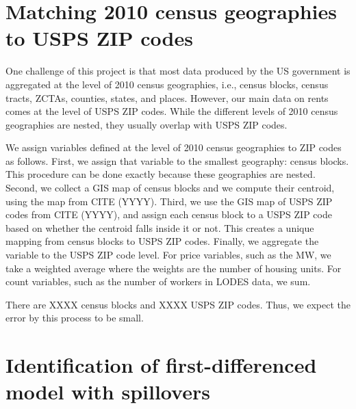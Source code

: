 \clearpage
\section{Matching 2010 census geographies to USPS ZIP codes}\label{sec:geo_crosswalk}

One challenge of this project is that most data produced by the US government
is aggregated at the level of 2010 census geographies, i.e., 
census blocks, census tracts, ZCTAs, counties, states, and places.
However, our main data on rents comes at the level of USPS ZIP codes.
While the different levels of 2010 census geographies are nested, they usually
overlap with USPS ZIP codes.

We assign variables defined at the level of 2010 census geographies to ZIP codes
as follows.
First, we assign that variable to the smallest geography: census blocks.
This procedure can be done exactly because these geographies are nested.
Second, we collect a GIS map of census blocks and we compute their centroid, using 
the map from CITE (YYYY).
Third, we use the GIS map of USPS ZIP codes from CITE (YYYY), and assign each
census block to a USPS ZIP code based on whether the centroid falls inside it 
or not.
This creates a unique mapping from census blocks to USPS ZIP codes.
Finally, we aggregate the variable to the USPS ZIP code level.
For price variables, such as the MW, we take a weighted average where the 
weights are the number of housing units.
For count variables, such as the number of workers in LODES data, we sum.

There are XXXX census blocks and XXXX USPS ZIP codes.
Thus, we expect the error by this process to be small.


\clearpage
\section{Identification of first-differenced model with spillovers}\label{sec:did_spillovers_id}

